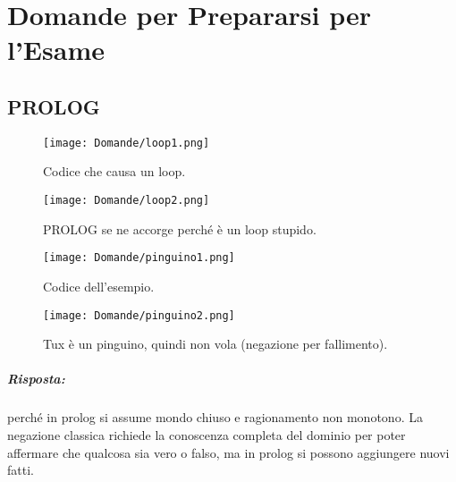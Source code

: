 \chapter{Domande per Prepararsi per l'Esame}

\section{PROLOG}



\begin{figure}[h]
    \centering
    \begin{minipage}{0.45\textwidth}
        \centering
        \texttt{[image: Domande/loop1.png]}
        \caption{Codice che causa un loop.}
    \end{minipage}
    \hfill
    \begin{minipage}{0.45\textwidth}
        \centering
        \texttt{[image: Domande/loop2.png]}
        \caption{PROLOG se ne accorge perché è un loop stupido.}
    \end{minipage}
\end{figure}



\begin{figure}[h]
    \centering
    \begin{minipage}{0.45\textwidth}
        \centering
        \texttt{[image: Domande/pinguino1.png]}
        \caption{Codice dell'esempio.}
    \end{minipage}
    \hfill
    \begin{minipage}{0.45\textwidth}
        \centering
        \texttt{[image: Domande/pinguino2.png]}
        \caption{Tux è un pinguino, quindi non vola (negazione per fallimento).}
    \end{minipage}
\end{figure}




\paragraph{Risposta:} perché in prolog si assume mondo chiuso e ragionamento non monotono. La negazione classica richiede la conoscenza completa del dominio per poter affermare che qualcosa sia vero o falso, ma in prolog si possono aggiungere nuovi fatti.

